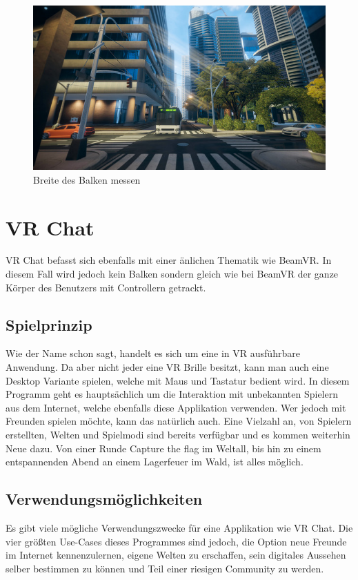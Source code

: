 \begin {figure}
    \includegraphics[scale=0.7]{pics/richiesplankexperience_world}
    \caption{Breite des Balken messen}
    \label{fig:richiesplankexperience_world}
\end {figure}


\section{VR Chat}
\label{sec:vrchat}
VR Chat befasst sich ebenfalls mit einer \"anlichen Thematik wie BeamVR.
In diesem Fall wird jedoch kein Balken sondern gleich wie bei BeamVR der ganze K\"orper des Benutzers mit Controllern getrackt.

\subsection{Spielprinzip}
\label{sec:vrchat_principle}
Wie der Name schon sagt, handelt es sich um eine in VR ausf\"uhrbare Anwendung.
Da aber nicht jeder eine VR Brille besitzt, kann man auch eine Desktop Variante spielen, welche mit Maus und Tastatur bedient wird.
In diesem Programm geht es haupts\"achlich um die Interaktion mit unbekannten Spielern aus dem Internet,
welche ebenfalls diese Applikation verwenden.
Wer jedoch mit Freunden spielen möchte, kann das nat\"urlich auch.
Eine Vielzahl an, von Spielern erstellten, Welten und Spielmodi sind bereits verfügbar und es kommen weiterhin Neue dazu.
Von einer Runde Capture the flag im Weltall, bis hin zu einem entspannenden Abend an einem Lagerfeuer im Wald, ist alles möglich.
~\cite{VRChat_2021_Steam}

\subsection{Verwendungsm\"oglichkeiten}
\label{sec:vrchat_usecases}
Es gibt viele m\"ogliche Verwendungszwecke für eine Applikation wie VR Chat.
Die vier gr\"oßten Use-Cases dieses Programmes sind jedoch, die Option neue Freunde im Internet kennenzulernen, eigene Welten zu erschaffen, sein digitales Aussehen selber bestimmen zu k\"onnen und Teil einer riesigen Community zu werden.
~\cite{VRChat_2021}

